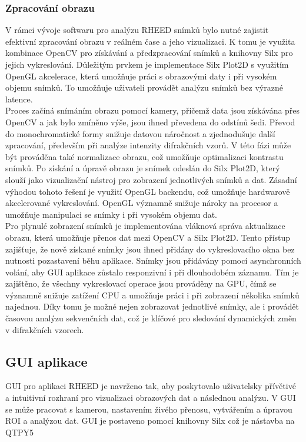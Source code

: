 \documentclass{article}
\begin{document}
\subsubsection{Zpracování obrazu}
V rámci vývoje softwaru pro analýzu RHEED snímků bylo nutné zajistit efektivní zpracování obrazu v reálném čase a jeho vizualizaci. K tomu je využita kombinace OpenCV pro získávání a předzpracování snímků a knihovny Silx pro jejich vykreslování. Důležitým prvkem je implementace Silx Plot2D s využitím OpenGL akcelerace, která umožňuje práci s obrazovými daty i při vysokém objemu snímků. To umožňuje uživateli provádět analýzu snímků bez výrazné latence.\\

Proces začíná snímáním obrazu pomocí kamery, přičemž data jsou získávána přes OpenCV a jak bylo zmíněno výše, jsou ihned převedena do odstínů šedi. Převod do monochromatické formy snižuje datovou náročnost a zjednodušuje další zpracování, především při analýze intenzity difrakčních vzorů. V této fázi může být prováděna také normalizace obrazu, což umožňuje optimalizaci kontrastu snímků. Po získání a úpravě obrazu je snímek odeslán do Silx Plot2D, který slouží jako vizualizační nástroj pro zobrazení jednotlivých snímků a dat. Zásadní výhodou tohoto řešení je využití OpenGL backendu, což umožňuje hardwarově akcelerované vykreslování. OpenGL významně snižuje nároky na procesor a umožňuje manipulaci se snímky i při vysokém objemu dat.\\

Pro plynulé zobrazení snímků je implementována vláknová správa aktualizace obrazu, která umožňuje přenos dat mezi OpenCV a Silx Plot2D. Tento přístup zajišťuje, že nově získané snímky jsou ihned přidány do vykreslovacího okna bez nutnosti pozastavení běhu aplikace. Snímky jsou přidávány pomocí asynchronních volání, aby GUI aplikace zůstalo responzivní i při dlouhodobém záznamu. Tím je zajištěno, že všechny vykreslovací operace jsou prováděny na GPU, čímž se významně snižuje zatížení CPU a umožňuje práci i při zobrazení několika snímků najednou. Díky tomu je možné nejen zobrazovat jednotlivé snímky, ale i provádět časovou analýzu sekvenčních dat, což je klíčové pro sledování dynamických změn v difrakčních vzorech.\\

\subsection{GUI aplikace}
GUI pro aplikaci RHEED je navrženo tak, aby poskytovalo uživatelsky přívětivé a intuitivní rozhraní pro vizualizaci obrazových dat a následnou analýzu. V GUI se může pracovat s kamerou, nastavením živého přenosu, vytvářením a úpravou ROI a analýzou dat. GUI je postaveno pomocí knihovny Silx což je nástavba na QTPY5
\end{document}
